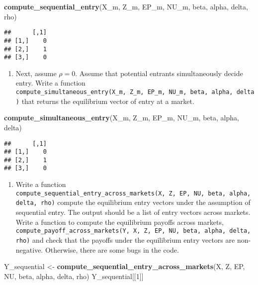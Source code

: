 \documentclass[
]{book}
\newenvironment{Shaded}{\begin{snugshade}}{\end{snugshade}}
\newcommand{\DecValTok}[1]{\textcolor[rgb]{0.00,0.00,0.81}{#1}}
\newcommand{\KeywordTok}[1]{\textcolor[rgb]{0.13,0.29,0.53}{\textbf{#1}}}
\newcommand{\NormalTok}[1]{#1}
\newcommand{\StringTok}[1]{\textcolor[rgb]{0.31,0.60,0.02}{#1}}
\providecommand{\tightlist}{%
  \setlength{\itemsep}{0pt}\setlength{\parskip}{0pt}}
\begin{document}
\begin{Shaded}
\begin{Highlighting}[]
\KeywordTok{compute_sequential_entry}\NormalTok{(X_m, Z_m, EP_m, NU_m, beta, alpha, delta, rho)}
\end{Highlighting}
\end{Shaded}

\begin{verbatim}
##      [,1]
## [1,]    0
## [2,]    1
## [3,]    0
\end{verbatim}

\begin{enumerate}
\def\labelenumi{\arabic{enumi}.}
\setcounter{enumi}{5}
\tightlist
\item
  Next, assume \(\rho = 0\). Assume that potential entrants simultaneously decide entry. Write a function \texttt{compute\_simultaneous\_entry(X\_m,\ Z\_m,\ EP\_m,\ NU\_m,\ beta,\ alpha,\ delta)} that returns the equilibrium vector of entry at a market.
\end{enumerate}

\begin{Shaded}
\begin{Highlighting}[]
\KeywordTok{compute_simultaneous_entry}\NormalTok{(X_m, Z_m, EP_m, NU_m, beta, alpha, delta)}
\end{Highlighting}
\end{Shaded}

\begin{verbatim}
##      [,1]
## [1,]    0
## [2,]    1
## [3,]    0
\end{verbatim}

\begin{enumerate}
\def\labelenumi{\arabic{enumi}.}
\setcounter{enumi}{6}
\tightlist
\item
  Write a function \texttt{compute\_sequential\_entry\_across\_markets(X,\ Z,\ EP,\ NU,\ beta,\ alpha,\ delta,\ rho)} compute the equilibrium entry vectors under the assumption of sequential entry. The output should be a list of entry vectors across markets. Write a function to compute the equilibrium payoffs across markets, \texttt{compute\_payoff\_across\_markets(Y,\ X,\ Z,\ EP,\ NU,\ beta,\ alpha,\ delta,\ rho)} and check that the payoffs under the equilibrium entry vectors are non-negative. Otherwise, there are some bugs in the code.
\end{enumerate}

\begin{Shaded}
\begin{Highlighting}[]
\NormalTok{Y_sequential <-}
\StringTok{  }\KeywordTok{compute_sequential_entry_across_markets}\NormalTok{(X, Z, EP, NU, beta, alpha, delta, rho)}
\NormalTok{Y_sequential[[}\DecValTok{1}\NormalTok{]]}
\end{Highlighting}
\end{Shaded}
\end{document}

